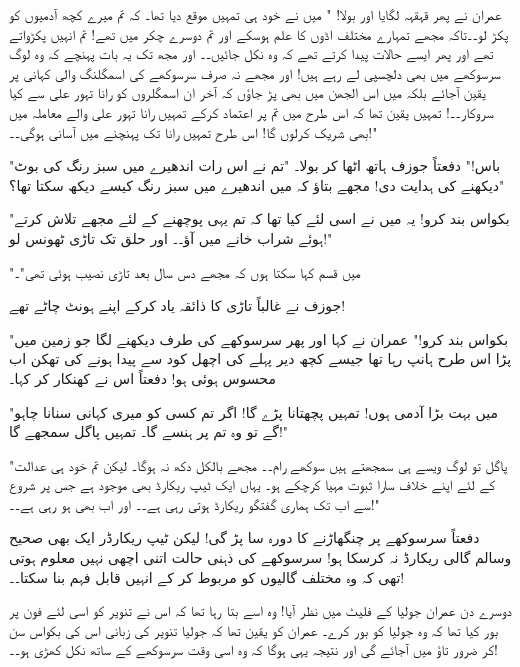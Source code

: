 عمران نے پھر قہقہہ لگایا اور بولا! " میں نے خود ہی تمہیں موقع دیا تھا۔ کہ تم میرے کچھ آدمیوں کو پکڑ لو۔۔تاکہ مجھے تمہارے مختلف اڈوں کا علم ہوسکے اور تم دوسرے چکر میں تھے! تم انہیں پکڑواتے تھے اور پھر ایسے حالات پیدا کرتے تھے کہ وہ نکل جائیں۔۔ اور مجھ تک یہ بات پہنچے کہ وہ لوگ سرسوکھے میں بھی دلچسپی لے رہے ہیں! اور مجھے نہ صرف سرسوکھے کی اسمگلنگ والی کہانی پر یقین آجائے بلکہ میں اس الجھن میں بھی پڑ جاؤں کہ آخر ان اسمگلروں کو رانا تہور علی سے کیا سروکار۔۔! تمہیں یقین تھا کہ اس طرح میں تم پر اعتماد کرکے تمہیں رانا تہور علی والے معاملہ میں بھی شریک کرلوں گا! اس طرح تمہیں رانا تک پہنچنے میں آسانی ہوگی۔۔!"

"باس!" دفعتاً جوزف ہاتھ اٹھا کر بولا۔ "تم نے اس رات اندھیرے میں سبز رنگ کی بوٹ دیکھنے کی ہدایت دی! مجھے بتاؤ کہ میں اندھیرے میں سبز رنگ کیسے دیکھ سکتا تھا؟"

"بکواس بند کرو! یہ میں نے اسی لئے کیا تھا کہ تم یہی پوچھنے کے لئے مجھے تلاش کرتے ہوئے شراب خانے میں آؤ۔۔ اور حلق تک تاڑی ٹھونس لو!"

"میں قسم کہا سکتا ہوں کہ مجھے دس سال بعد تاڑی نصیب ہوئی تھی"۔

جوزف نے غالباً تاڑی کا ذائقہ یاد کرکے اپنے ہونٹ چاٹے تھے!

"بکواس بند کرو!" عمران نے کہا اور پھر سرسوکھے کی طرف دیکھنے لگا جو زمین میں پڑا اس طرح ہانپ رہا تھا جیسے کچھ دیر پہلے کی اچھل کود سے پیدا ہونے کی تھکن اب محسوس ہوئی ہو! دفعتاً اس نے کھنکار کر کہا۔

"میں بہت بڑا آدمی ہوں! تمہیں پچھتانا پڑے گا! اگر تم کسی کو میری کہانی سنانا چاہو گے تو وہ تم پر ہنسے گا۔ تمہیں پاگل سمجھے گا!"

"پاگل تو لوگ ویسے ہی سمجھتے ہیں سوکھے رام۔۔ مجھے بالکل دکھ نہ ہوگا۔ لیکن تم خود ہی عدالت کے لئے اپنے خلاف سارا ثبوت مہیا کرچکے ہو۔ یہاں ایک ٹیپ ریکارڈ بھی موجود ہے جس پر شروع سے اب تک ہماری گفتگو ریکارڈ ہوتی رہی ہے۔۔ اور اب بھی ہو رہی ہے۔۔!"

دفعتاً سرسوکھے پر چنگھاڑنے کا دورہ سا پڑ گی! لیکن ٹیپ ریکارڈر ایک بھی صحیح وسالم گالی ریکارڈ نہ کرسکا ہو! سرسوکھے کی ذہنی حالت اتنی اچھی نہیں معلوم ہوتی تھی کہ وہ مختلف گالیوں کو مربوط کر کے انہیں قابل فہم بنا سکتا۔۔!



\endR

\bigskip\bigskip\bigskip

\centerline{}
\bigskip\bigskip\bigskip
\beginR
\body

دوسرے دن عمران جولیا کے فلیٹ میں نظر آیا! وہ اسے بتا رہا تھا کہ اس نے تنویر کو اسی لئے فون پر بور کیا تھا کہ وہ جولیا کو بور کرے۔ عمران کو یقین تھا کہ جولیا تنویر کی زبانی اس کی بکواس سن کر ضرور تاؤ میں آجائے گی اور نتیجہ یہی ہوگا کہ وہ اسی وقت سرسوکھے کے ساتھ نکل کھڑی ہو۔۔!

